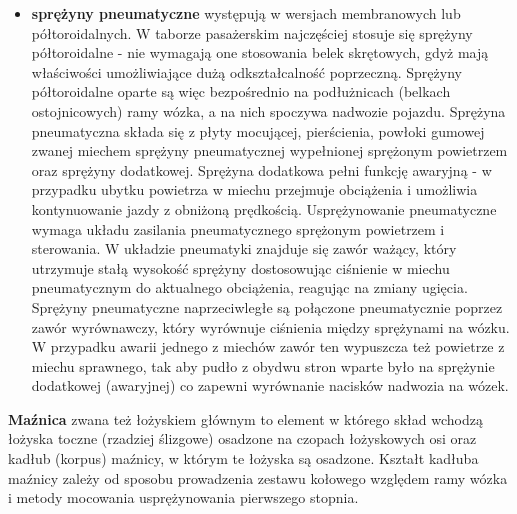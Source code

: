 \begin{itemize}
	W tych pierwszych pomiędzy pierścieniami gumowymi znajdują się pasy gumy natomiast środkiem tego zespołu biegnie kolumna prowadząca zestaw kołowy. W rozwiązaniu klinowym, powszechnie stosowanym w nowych pojazdach trakcyjnych, sprężyna składa się z dwóch pakietów kątowych elementów gumowych przedzielonych kątowymi blaszkami.  
	\item  \textbf{sprężyny pneumatyczne} występują w wersjach membranowych lub półtoroidalnych. 
	W taborze pasażerskim najczęściej stosuje się sprężyny półtoroidalne - nie wymagają one stosowania belek skrętowych, gdyż mają właściwości umożliwiające dużą odkształcalność poprzeczną. Sprężyny półtoroidalne oparte są więc bezpośrednio na podłużnicach (belkach ostojnicowych) ramy wózka, a na nich spoczywa nadwozie pojazdu. Sprężyna pneumatyczna składa się z płyty mocującej, pierścienia, powłoki gumowej zwanej miechem sprężyny pneumatycznej wypełnionej sprężonym powietrzem oraz sprężyny dodatkowej. Sprężyna dodatkowa pełni funkcję awaryjną - w przypadku ubytku powietrza w miechu przejmuje obciążenia i umożliwia kontynuowanie jazdy z obniżoną prędkością. Usprężynowanie pneumatyczne wymaga układu zasilania pneumatycznego sprężonym powietrzem i sterowania. W układzie pneumatyki znajduje się zawór ważący, który utrzymuje stałą wysokość sprężyny dostosowując ciśnienie w miechu pneumatycznym do aktualnego obciążenia, reagując na zmiany ugięcia. 
	Sprężyny pneumatyczne naprzeciwległe są połączone pneumatycznie poprzez zawór wyrównawczy, który wyrównuje ciśnienia między sprężynami na wózku. W przypadku awarii jednego z miechów zawór ten wypuszcza też powietrze z miechu sprawnego, tak aby pudło z obydwu stron wparte było na sprężynie dodatkowej (awaryjnej) co zapewni wyrównanie nacisków nadwozia na wózek. 
	\end{itemize}

\textbf{Maźnica} zwana też łożyskiem głównym to element w którego skład wchodzą łożyska toczne (rzadziej ślizgowe) osadzone na czopach łożyskowych osi oraz kadłub (korpus) maźnicy, w którym te łożyska są osadzone. Kształt kadłuba maźnicy zależy od sposobu prowadzenia zestawu kołowego względem ramy wózka i metody mocowania usprężynowania pierwszego stopnia.


